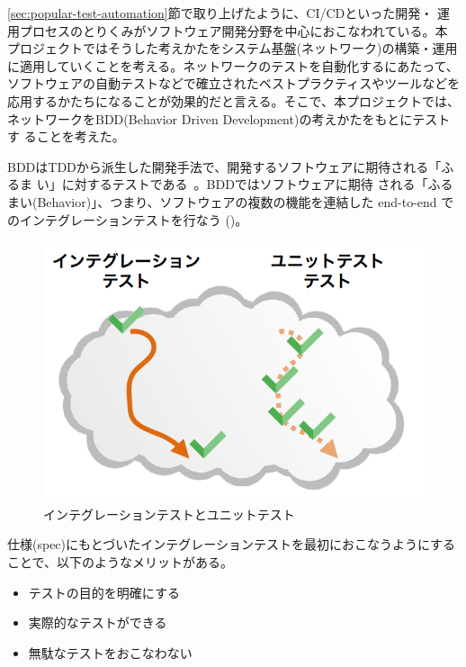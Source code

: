\ref{sec:popular-test-automation}節で取り上げたように、CI/CDといった開発・
運用プロセスのとりくみがソフトウェア開発分野を中心におこなわれている。本
プロジェクトではそうした考えかたをシステム基盤(ネットワーク)の構築・運用
に適用していくことを考える。ネットワークのテストを自動化するにあたって、
ソフトウェアの自動テストなどで確立されたベストプラクティスやツールなどを
応用するかたちになることが効果的だと言える。そこで、本プロジェクトでは、
ネットワークをBDD(Behavior Driven Development)の考えかたをもとにテストす
ることを考えた。

BDDはTDDから派生した開発手法で、開発するソフトウェアに期待される「ふるま
い」に対するテストである~\cite{wikipedia-bdd}。BDDではソフトウェアに期待
される「ふるまい(Behavior)」、つまり、ソフトウェアの複数の機能を連結した
end-to-end でのインテグレーションテストを行なう
()。

\begin{figure}[h]
 \centering
 \includegraphics[scale=0.6]{img/test-difference.png}
 \caption{インテグレーションテストとユニットテスト}
 \label{fig:test-difference}
\end{figure}

仕様(spec)にもとづいたインテグレーションテストを最初におこなうようにする
ことで、以下のようなメリットがある。
\begin{itemize}
 \item テストの目的を明確にする
 \item 実際的なテストができる
 \item 無駄なテストをおこなわない
\end{itemize}

